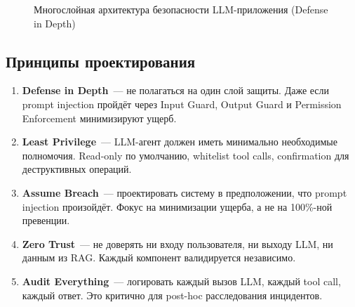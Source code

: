 \documentclass[12pt,a4paper]{article}
\begin{document}
\begin{figure}[H]
\caption{Многослойная архитектура безопасности LLM-приложения (Defense in Depth)}
\label{fig:security_arch}
\end{figure}

\subsection{Принципы проектирования}

\begin{enumerate}
  \item \textbf{Defense in Depth}~--- не полагаться на один слой защиты. Даже если prompt injection пройдёт через Input Guard, Output Guard и Permission Enforcement минимизируют ущерб.

  \item \textbf{Least Privilege}~--- LLM-агент должен иметь минимально необходимые полномочия. Read-only по умолчанию, whitelist tool calls, confirmation для деструктивных операций.

  \item \textbf{Assume Breach}~--- проектировать систему в предположении, что prompt injection произойдёт. Фокус на минимизации ущерба, а не на 100\%-ной превенции.

  \item \textbf{Zero Trust}~--- не доверять ни входу пользователя, ни выходу LLM, ни данным из RAG. Каждый компонент валидируется независимо.

  \item \textbf{Audit Everything}~--- логировать каждый вызов LLM, каждый tool call, каждый ответ. Это критично для post-hoc расследования инцидентов.
\end{enumerate}
\end{document}
